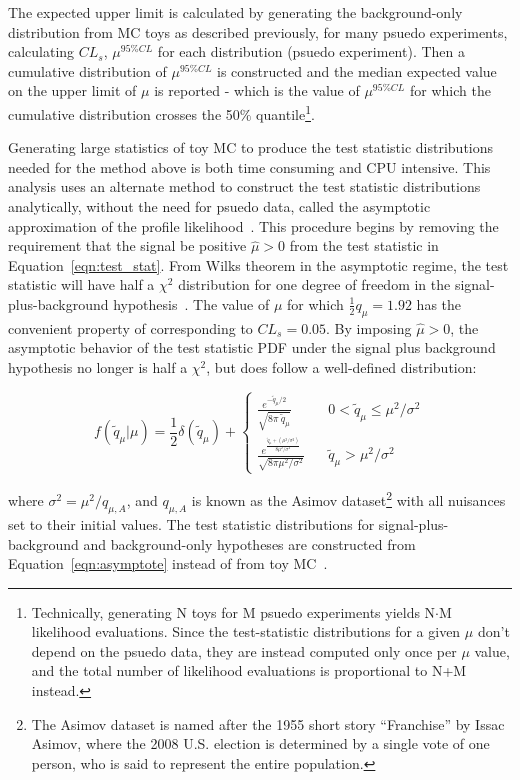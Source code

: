 The expected upper limit is calculated by generating the background-only distribution from MC toys as described previously, for many psuedo experiments, calculating $CL_{s}$, $\mu^{95\% CL}$
for each distribution (psuedo experiment). Then a cumulative distribution of $\mu^{95\% CL}$ is constructed and the median expected value on the upper limit of $\mu$ is reported - which is the value
of $\mu^{95\% CL}$ for which the cumulative distribution crosses the 50$\%$ quantile\footnote{Technically, generating N toys for M psuedo experiments yields N$\cdot$M likelihood evaluations. Since the test-statistic
distributions for a given $\mu$ don't depend on the psuedo data, they are instead computed only once per $\mu$ value, and the total number of likelihood evaluations is proportional to N+M instead.}.

Generating large statistics of toy MC to produce the test statistic distributions needed for the method above is both time consuming and CPU intensive. This analysis uses an alternate method to
construct the test statistic distributions analytically, without the need for psuedo data, called the asymptotic approximation of the profile likelihood~\cite{AsymptoticLimits}.  
This procedure begins by removing the requirement that the signal be positive $\hat{\mu} > 0$ from the test statistic in Equation~\ref{eqn:test_stat}. From Wilks theorem
in the asymptotic regime, the test statistic will have half a $\chi^{2}$ distribution for one degree of freedom in the signal-plus-background hypothesis~\cite{wilks}. The value of $\mu$ for which
$\frac{1}{2}q_{\mu} = 1.92$ has the convenient property of corresponding to $CL_{s} = 0.05$. By imposing $\hat{\mu} > 0$, the asymptotic behavior of the test statistic PDF under the signal plus
background hypothesis no longer is half a $\chi^{2}$, but does follow a well-defined distribution:

\begin{equation}
\label{eqn:asymptote}
f(\tilde{q}_{\mu}|\mu) = \frac{1}{2}\delta(\tilde{q}_{\mu}) + \begin{cases}
  \frac{e^{-\tilde{q}_{\mu}/2}}{\sqrt{8\pi~\tilde{q}_{\mu}}} & ~~~~ 0 < \tilde{q}_{\mu} \leq \mu^{2}/\sigma^{2} \\
  \frac{e^{\frac{\tilde{q}_{\mu}+(\mu^{2}/\sigma^{2})}{8\mu^{2}/\sigma^{2}}}}{\sqrt{8\pi\mu^{2}/\sigma^{2}}} & ~~~~ \tilde{q}_{\mu} > \mu^{2}/\sigma^{2}
  \end{cases}
\end{equation}

\noindent where $\sigma^{2} = \mu^{2}/q_{\mu,A}$, and $q_{\mu,A}$ is known as the Asimov dataset\footnote{The Asimov dataset is named after the 1955 short story ``Franchise'' by Issac Asimov, where the 2008
U.S. election is determined by a single vote of one person, who is said to represent the entire population.} with all nuisances set to their initial values. The test statistic distributions for
signal-plus-background and background-only hypotheses are constructed from Equation~\ref{eqn:asymptote} instead of from toy MC~\cite{CMS-AN-11-298}. 

